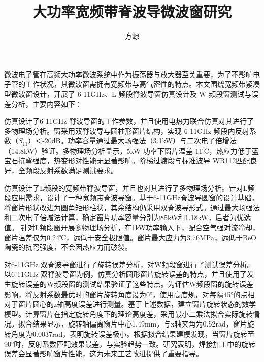 \documentclass[master]{thesis-uestc}
\title{大功率宽频带脊波导微波窗研究}{Research on High-Power Broadband Ridge Waveguide Microwave Window} %
\author{方源}{Fang Yuan} %
\begin{document}
\makecover %
\originalitydeclaration %
\begin{chineseabstract}
    微波电子管在高频大功率微波系统中作为振荡器与放大器至关重要，为了不影响电子管的工作状况，其微波窗需拥有宽频带与高气密性的特点。本文围绕宽频带紧凑型微波窗设计，开展了 6-11GHz、L 频段脊波导窗仿真设计及 W 频段窗测试与误差分析，主要内容如下：

    仿真设计了6-11GHz 脊波导窗的工作参数，并且使用电热力联合仿真对其进行了多物理场分析。窗采用双脊波导与圆柱形窗片结构，实现 6-11GHz 频段内反射系数（\(S_{11}\)）＜-20dB。功率容量通过最大场强法（3.1kW）与二次电子倍增法（14.8kW）验证。多物理场分析显示，5kW 功率下窗片温差 11℃，热应力低于蓝宝石抗弯强度，热变形对性能无显著影响。阶梯过渡段与标准波导 WR112匹配良好，全频段反射系数满足测试要求。

    仿真设计了L频段的宽频带脊波导窗，并且也对其进行了多物理场分析。针对L频段应用需求，设计了一种宽频带脊波导窗。基于6-11GHz脊波导圆窗的设计基础，将窗片形状改进为圆角矩形柱状，其余结构仍采用双脊波导形式。通过最大场强法和二次电子倍增法计算，确定窗片功率容量分别为85kW和1.18kW，后者为优选值。
    针对L频段窗开展多物理场分析，在1kW功率输入下，配合空气强对流冷却，窗片温差仅为0.24℃，远低于安全极限值。窗片最大应力为3.76MPa，远低于BeO陶瓷的抗弯强度，不会因热应力而破裂。

    对6-11GHz 双脊波导窗进行了旋转误差分析，对W频段窗进行了测试误差分析。以6-11GHz 双脊波导窗为例，仿真分析圆形窗片旋转误差的特点，并且使用了发生旋转误差的W频段窗的测试结果验证了这些特点。为评估W频段窗的旋转误差影响，将反射系数最优时的窗片旋转角度设为0°，使用高度规，对每隔45°的点相对于窗片圆心的z轴高度误差进行测量。基于上述数据，建立窗片旋转状态的数学模型。计算窗片在指定旋转角度下的理论高度差，采用最小二乘法拟合实际旋转情况。拟合结果显示，旋转轴偏离窗片中心1.49mm，与x轴夹角为0.52rad，窗片旋转角度为0.0037rad，表明旋转误差极小。根据拟合结果建模发现，当窗片旋转至90°时，反射系数匹配效果最差，与实验趋势一致。研究表明，焊接加工中的旋转误差会显著影响窗片性能，这为未来工艺改进提供了重要指导。

\end{chineseabstract}
\end{document}
